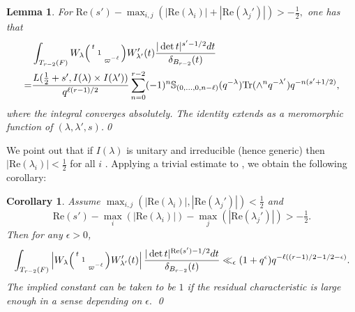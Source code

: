 \documentclass[12pt]{amsart}
\newtheorem{cor}[thm]{Corollary}
\newtheorem{lem}[thm]{Lemma}
\theoremstyle{remark}
\numberwithin{equation}{section}
\theoremstyle{definition}
\newenvironment{psmatrix}
  {\left(\begin{smallmatrix}}
  {\end{smallmatrix}\right)}
\numberwithin{equation}{subsection}
\begin{document}
\begin{lem}\label{lem:rankin} 
 For $\mathrm{Re}(s')-\max_{i,j}(|\mathrm{Re}(\lambda_i)|+|\mathrm{Re}(\lambda_j')|)>-\tfrac{1}{2},$ one has that
\begin{align*}
 &\int_{T_{r-2}(F)}  W_{\lambda}\begin{psmatrix} t & &\\ & 1& \\ & & \varpi^{-\ell}\end{psmatrix} W'_{\lambda'}(t) \frac{|\det t|^{s'-1/2}dt}{\delta_{B_{r-2}}(t)}\\
 =&\frac{L(\tfrac{1}{2}+s',I(\lambda) \times I(\lambda'))}{q^{\ell(r-1)/2}}\sum_{n=0}^{r-2} (-1)^{n}\mathbb{S}_{(0,\dots,0, n-\ell)}(q^{-\lambda})\mathrm{Tr}(\wedge^n q^{-\lambda'})q^{-n(s'+1/2)},
\end{align*}
where the integral converges absolutely.
The identity extends as a meromorphic function of $(\lambda,\lambda',s)$.\qed
\end{lem}

\noindent We point out that if $I(\lambda)$ is unitary and irreducible (hence generic) then $|\mathrm{Re}(\lambda_i)|<\tfrac{1}{2}$ for all $i$ \cite[Corollary 2.5]{JacquetShalikaEPI}.
Applying a trivial estimate to \cite[(6.1.5)]{GGHL}, we obtain the following corollary:

\begin{cor} \label{cor:unram:bound}
Assume
 $\max_{i,j}(|\mathrm{Re}(\lambda_i)|,|\mathrm{Re}(\lambda_j')|)<\tfrac{1}{2}$  and 
 $$\mathrm{Re}(s')-\max_i(|\mathrm{Re}(\lambda_i)|)-\max_j(|\mathrm{Re}(\lambda_j')|)>-\tfrac{1}{2}.$$  
 Then for any $\epsilon>0$,
\begin{align*}
\int_{T_{r-2}(F) }  \left|W_{\lambda}\begin{psmatrix} t & &\\ & 1& \\ & & \varpi^{-\ell}\end{psmatrix} W'_{\lambda'}(t)\right| \frac{|\det t|^{\mathrm{Re}(s')-1/2}dt}{\delta_{B_{r-2}}(t)} \ll_{\epsilon} (1+q^{\epsilon})q^{-\ell((r-1)/2-1/2-\epsilon)}.
\end{align*}
The implied constant can be taken to be $1$ if the 
residual characteristic is large enough in a sense depending on $\epsilon.$ \qed
\end{cor}
\end{document}
